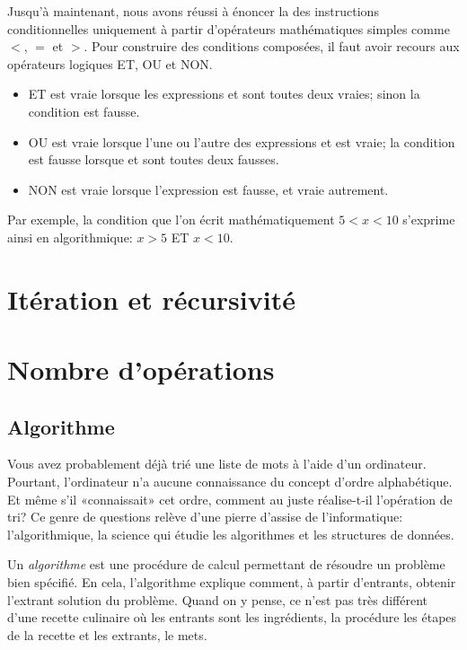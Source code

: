 Jusqu'à maintenant, nous avons réussi à énoncer la 
des instructions conditionnelles uniquement à partir d'opérateurs
mathématiques simples comme $<$, $=$ et $>$. Pour construire des
conditions composées, il faut avoir recours aux opérateurs logiques
ET, OU et NON.
\begin{itemize}
\item {} ET  est vraie lorsque les expressions
   et  sont toutes deux vraies; sinon la
  condition est fausse.
\item {} OU  est vraie lorsque l'une ou l'autre
  des expressions  et  est vraie; la condition
  est fausse lorsque  et  sont toutes deux
  fausses.
\item NON  est vraie lorsque l'expression  est fausse,
  et vraie autrement.
\end{itemize}

Par exemple, la condition que l'on écrit mathématiquement $5 < x < 10$
s'exprime ainsi en algorithmique: $x > 5$ ET $x < 10$.


\section{Itération et récursivité}
\label{sec:algorithmes:iteration}

\section{Nombre d'opérations}
\label{sec:algorithmes:bigO}




\subsection{Algorithme}
\label{sec:informatique:concepts:algorithme}

Vous avez probablement déjà trié une liste de mots à l'aide d'un
ordinateur. Pourtant, l'ordinateur n'a aucune connaissance du concept
d'ordre alphabétique. Et même s'il «connaissait» cet ordre, comment au
juste réalise-t-il l'opération de tri? Ce genre de questions relève
d'une pierre d'assise de l'informatique:
l'algorithmique, la science qui étudie les
algorithmes et les structures de données.

Un \emph{algorithme} est une procédure de calcul
permettant de résoudre un problème bien spécifié. En cela,
l'algorithme explique comment, à partir d'entrants, obtenir l'extrant
solution du problème. Quand on y pense, ce n'est pas très différent
d'une recette culinaire où les entrants sont les ingrédients, la
procédure les étapes de la recette et les extrants, le mets.

